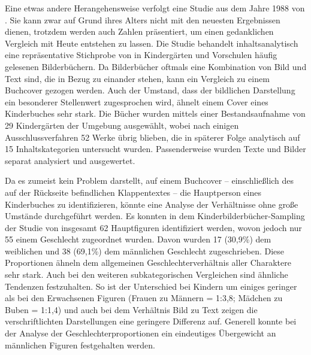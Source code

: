     Eine etwas andere Herangehensweise verfolgt eine Studie aus dem Jahre 1988
    von \citeauthor{Schmerl1988}. Sie kann zwar auf Grund ihres Alters nicht mit
    den neuesten Ergebnissen dienen, trotzdem werden auch Zahlen präsentiert, um
    einen gedanklichen Vergleich mit Heute entstehen zu lassen. Die Studie
    behandelt inhaltsanalytisch eine repräsentative Stichprobe von in
    Kindergärten und Vorschulen häufig gelesenen Bilderbüchern. Da Bilderbücher
    oftmals eine Kombination von Bild und Text sind, die in Bezug zu einander
    stehen, kann ein Vergleich zu einem Buchcover gezogen werden. Auch der
    Umstand, dass der bildlichen Darstellung ein besonderer Stellenwert
    zugesprochen wird, ähnelt einem Cover eines Kinderbuches sehr stark. Die
    Bücher wurden mittels einer Bestandsaufnahme von 29 Kindergärten der
    Umgebung ausgewählt, wobei nach einigen Ausschlussverfahren 52 Werke übrig
    blieben, die in späterer Folge analytisch auf 15 Inhaltskategorien
    untersucht wurden. Passenderweise wurden Texte und Bilder separat analysiert
    und ausgewertet. \parencite[133\psq]{Schmerl1988}


      Da es zumeist kein Problem darstellt, auf einem Buchcover --
      einschließlich des auf der Rückseite befindlichen Klappentextes -- die
      Hauptperson eines Kinderbuches zu identifizieren, könnte eine Analyse der
      Verhältnisse ohne große Umstände durchgeführt werden. Es konnten in dem
      Kinderbilderbücher-Sampling der Studie von \citeauthor{Schmerl1988}
      insgesamt 62 Hauptfiguren identifiziert werden, wovon jedoch nur 55 einem
      Geschlecht zugeordnet wurden. Davon wurden 17 (30,9\%) dem weiblichen und
      38 (69,1\%) dem männlichen Geschlecht zugeschrieben. Diese Proportionen
      ähneln dem allgemeinen Geschlechterverhältnis aller Charaktere sehr stark.
      Auch bei den weiteren subkategorischen Vergleichen sind ähnliche Tendenzen
      festzuhalten. So ist der Unterschied bei Kindern um einiges geringer als
      bei den Erwachsenen Figuren (Frauen zu Männern = 1:3,8; Mädchen zu Buben =
      1:1,4) und auch bei dem Verhältnis Bild zu Text zeigen die
      verschriftlichten Darstellungen eine geringere Differenz auf. Generell
      konnte bei der Analyse der Geschlechterproportionen ein eindeutiges
      Übergewicht an männlichen Figuren festgehalten werden.
      \parencite[136\psq]{Schmerl1988}


